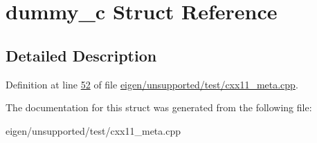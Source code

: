 \hypertarget{structdummy__c}{}\section{dummy\+\_\+c Struct Reference}
\label{structdummy__c}


\subsection{Detailed Description}


Definition at line \hyperlink{eigen_2unsupported_2test_2cxx11__meta_8cpp_source_l00052}{52} of file \hyperlink{eigen_2unsupported_2test_2cxx11__meta_8cpp_source}{eigen/unsupported/test/cxx11\+\_\+meta.\+cpp}.



The documentation for this struct was generated from the following file\+:\begin{DoxyCompactItemize}
\item 
eigen/unsupported/test/cxx11\+\_\+meta.\+cpp\end{DoxyCompactItemize}
